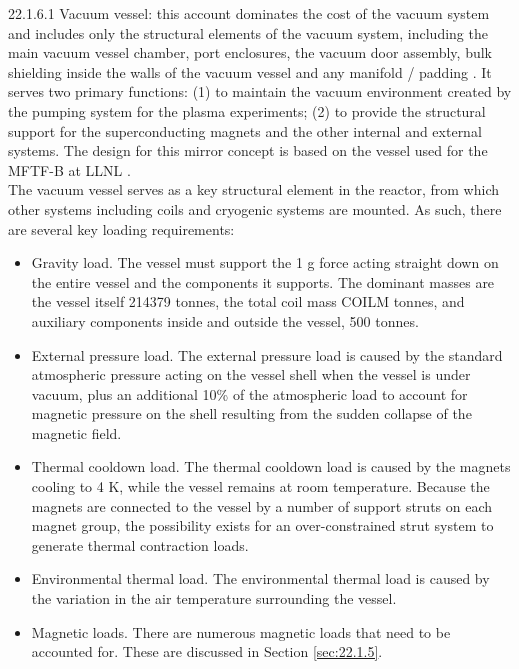 22.1.6.1 Vacuum vessel: this account dominates the cost of the vacuum system and includes only the structural elements of the vacuum system, including the main vacuum vessel chamber, port enclosures, the vacuum door assembly, bulk shielding inside the walls of the vacuum vessel and any manifold / padding \cite{waganer2006design}. It serves two primary functions: (1) to maintain the vacuum environment created by the pumping system for the plasma experiments; (2) to provide the structural support for the superconducting magnets and the other internal and external systems. The design for this mirror concept is based on the vessel used for the MFTF-B at LLNL \cite{gerich1986design}. \\

The vacuum vessel serves as a  key structural element in the reactor, from which other systems including coils and cryogenic systems are mounted.  As such, there are several key loading requirements:

\begin{itemize}
    \item Gravity load. The vessel must support the 1 g force acting straight down on the entire vessel and the components it supports. The dominant masses are the vessel itself 214379 tonnes, the total coil mass COILM tonnes, and auxiliary components inside and outside the vessel, 500 tonnes.

    \item External pressure load. The external pressure load is caused by the standard atmospheric pressure acting on the vessel shell when the vessel is under vacuum, plus an additional 10\% of the atmospheric load to account for magnetic  pressure on the shell resulting from the sudden collapse of the magnetic field. 

    \item Thermal cooldown load. The thermal cooldown load is  caused by the magnets cooling to 4 K, while the vessel remains at room temperature. Because the magnets are connected to the vessel by a number of support struts on each  magnet group, the possibility exists for an over-constrained  strut system to generate thermal contraction loads.

    \item Environmental thermal load. The environmental thermal load is caused by the variation in the air temperature surrounding the vessel.

    \item Magnetic loads. There are numerous magnetic loads that need to be accounted for. These are discussed in Section \ref{sec:22.1.5}.
\end{itemize}


